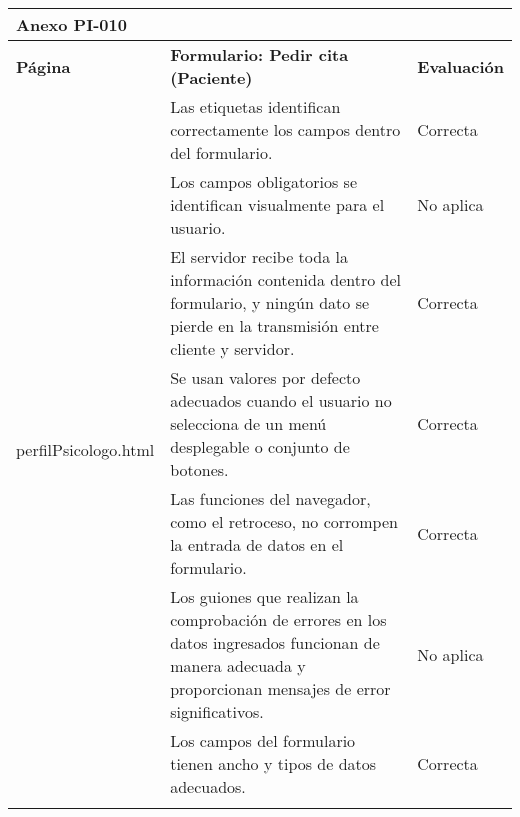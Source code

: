 \begin{table}[htpb]
\centering
\begin{tabularx}{\textwidth}{|l|X|l|}
\hline
\multicolumn{3}{|l|}{\textbf{Anexo PI-010}}                                                                                                                                                                               \\ \hline
\textbf{Página}                        & \textbf{Formulario: Pedir cita (Paciente)}                                                                                                                & \textbf{Evaluación} \\ \hline
\multirow{10}{*}{perfilPsicologo.html} & Las etiquetas identifican correctamente los campos dentro del formulario.                                                                                 & Correcta            \\ \cline{2-3} 
                                       & Los campos obligatorios se identifican visualmente para el usuario.                                                                                       & No aplica           \\ \cline{2-3} 
                                       & El servidor recibe toda la información contenida dentro del formulario, y ningún dato se pierde en la transmisión entre cliente y servidor.               & Correcta            \\ \cline{2-3} 
                                       & Se usan valores por defecto adecuados cuando el usuario no selecciona de un menú desplegable o conjunto de botones.                                       & Correcta            \\ \cline{2-3} 
                                       & Las funciones del navegador, como el retroceso, no corrompen la entrada de datos en el formulario.                                                        & Correcta            \\ \cline{2-3} 
                                       & Los guiones que realizan la comprobación de errores en los datos ingresados funcionan de manera adecuada y proporcionan mensajes de error significativos. & No aplica           \\ \cline{2-3} 
                                       & Los campos del formulario tienen ancho y tipos de datos adecuados.                                                                                        & Correcta            \\ \cline{2-3} 

\end{tabularx}
\end{table}
